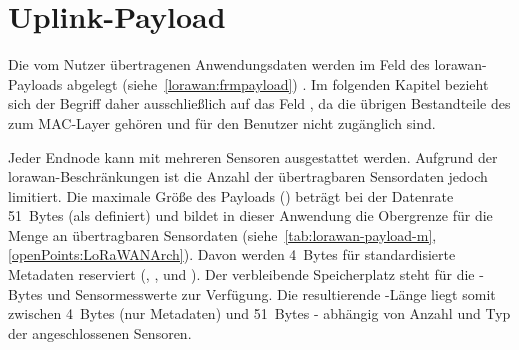 	
%	 
%		
%	
%	
%	

	
\section{Uplink-Payload}
	Die vom Nutzer übertragenen Anwendungsdaten werden im Feld  des \acs{lorawan}-Payloads abgelegt (siehe~\autoref{lorawan:frmpayload}) . Im folgenden Kapitel bezieht sich der Begriff  daher ausschlie{\ss}lich auf das Feld , da die übrigen Bestandteile des  zum MAC-Layer gehören und für den Benutzer nicht zugänglich sind.

	\medskip

	Jeder Endnode kann mit mehreren Sensoren ausgestattet werden. Aufgrund der \ac{lorawan}-Beschränkungen ist die Anzahl der übertragbaren Sensordaten jedoch limitiert. Die maximale Grö{\ss}e des Payloads () beträgt bei der Datenrate~ 51~Bytes (als  definiert) und bildet in dieser Anwendung die Obergrenze für die Menge an übertragbaren Sensordaten (siehe~\autoref{tab:lorawan-payload-m}, \autoref{openPoints:LoRaWANArch}). Davon werden 4~Bytes für standardisierte Metadaten reserviert (, ,  und ). Der verbleibende Speicherplatz steht für die -Bytes und Sensormesswerte zur Verfügung. Die resultierende  -Länge liegt somit zwischen 4~Bytes (nur Metadaten) und 51~Bytes - abhängig von Anzahl und Typ der angeschlossenen Sensoren.
	



